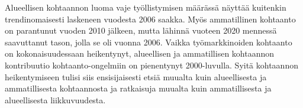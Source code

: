 \documentclass[12pt]{article}
\begin{document}
Alueellisen kohtaannon luoma vaje työllistymisen määrässä näyttää kuitenkin trendinomaisesti laskeneen vuodesta 2006 saakka. Myös ammatillinen kohtaanto on parantunut vuoden 2010 jälkeen, mutta lähinnä vuoteen 2020 mennessä saavuttanut tason, jolla se oli vuonna 2006. Vaikka työmarkkinoiden kohtaanto on kokonaisuudessaan heikentynyt, alueellisen ja ammatillisen kohtaannon kontribuutio kohtaanto-ongelmiin on pienentynyt 2000-luvulla. Syitä kohtaannon heikentymiseen tulisi siis ensisijaisesti etsiä muualta kuin alueellisesta ja ammatillisesta kohtaannosta ja ratkaisuja muualta kuin ammatillisesta ja alueellisesta liikkuvuudesta. 

\newpage


\end{document}
